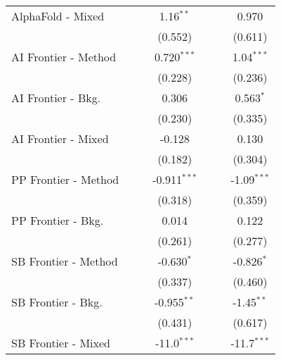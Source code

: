 \begin{tabular}{lcccccc}
   AlphaFold - Mixed    &               &             & 1.16$^{**}$    &               &              & 0.970\\   
                        &               &             & (0.552)        &               &              & (0.611)\\   
   AI Frontier - Method &               &             & 0.720$^{***}$  &               &              & 1.04$^{***}$\\   
                        &               &             & (0.228)        &               &              & (0.236)\\   
   AI Frontier - Bkg.   &               &             & 0.306          &               &              & 0.563$^{*}$\\   
                        &               &             & (0.230)        &               &              & (0.335)\\   
   AI Frontier - Mixed  &               &             & -0.128         &               &              & 0.130\\   
                        &               &             & (0.182)        &               &              & (0.304)\\   
   PP Frontier - Method &               &             & -0.911$^{***}$ &               &              & -1.09$^{***}$\\   
                        &               &             & (0.318)        &               &              & (0.359)\\   
   PP Frontier - Bkg.   &               &             & 0.014          &               &              & 0.122\\   
                        &               &             & (0.261)        &               &              & (0.277)\\   
   SB Frontier - Method &               &             & -0.630$^{*}$   &               &              & -0.826$^{*}$\\   
                        &               &             & (0.337)        &               &              & (0.460)\\   
   SB Frontier - Bkg.   &               &             & -0.955$^{**}$  &               &              & -1.45$^{**}$\\   
                        &               &             & (0.431)        &               &              & (0.617)\\   
   SB Frontier - Mixed  &               &             & -11.0$^{***}$  &               &              & -11.7$^{***}$\\   

\end{tabular}
